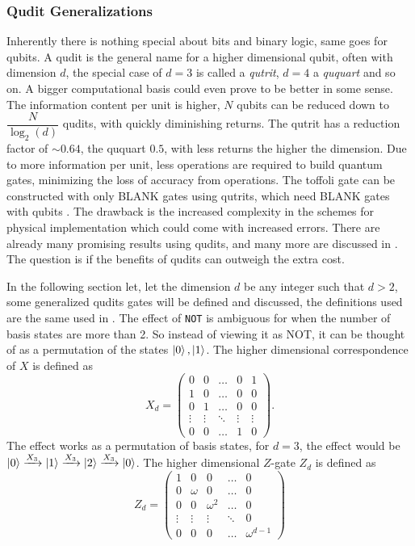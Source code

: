 \subsubsection{Qudit Generalizations}
Inherently there is nothing special about bits and binary logic, same goes for qubits.  A qudit is the general name for a higher dimensional qubit, often with dimension $d$, the special case of $d = 3 
$ is called a \textit{qutrit}, $d = 4$ a \textit{ququart} and so on. A bigger computational basis could even prove to be better in some sense. The information content per unit is higher, $N$ qubits can be reduced down to $\dfrac{N}{\log_2(d)}$ qudits\cite{info_qudit}, with quickly diminishing returns. The qutrit has a reduction factor of $\sim 0.64$, the ququart $0.5$, with less returns the higher the dimension. Due to more information per unit, less operations are required to build quantum gates, minimizing the loss of accuracy from operations. The toffoli gate can be constructed with only BLANK gates using qutrits, which need BLANK gates with qubits . The drawback is the increased complexity in the schemes for physical implementation which could come with increased errors. There are already many promising results using qudits\cite{qutrit1}\cite{qudit2}\cite{qudit3}, and many more are discussed in \cite{qudit}. The question is if the benefits of qudits can outweigh the extra cost.

In the following section let, let the dimension $d$ be any integer such that $d > 2$, some generalized qudits gates will be defined and discussed, the definitions used are the same used in \cite{qudit}.
The effect of {\tt NOT} is ambiguous for when the number of basis states are more than 2. So instead of viewing it as NOT, it can be thought of as a permutation of the states $\ket{0},\ket{1}$. The higher dimensional correspondence of $X$ is defined as
\begin{equation}
X_d = \begin{pmatrix}
0 & 0 & \dots & 0 & 1\\
1 & 0 & \dots & 0 & 0\\
0 & 1 & \dots & 0 & 0\\
\vdots & \vdots &\ddots& \vdots&\vdots\\
0 & 0& \dots & 1 & 0
\end{pmatrix}.
\end{equation}
The effect works as a permutation of basis states, for $d = 3$, the effect would be $\ket{0} \xrightarrow{X_3} \ket{1} \xrightarrow{X_3} \ket{2} \xrightarrow{X_3} \ket{0}$.
The higher dimensional $Z$-gate $Z_d$ is defined as 
\begin{equation}
Z_d = \begin{pmatrix}
1 & 0 & 0 & \dots & 0 \\
0 & \omega & 0 &\dots & 0\\
0 & 0 & \omega^2&\dots & 0 \\
\vdots & \vdots&\vdots&\ddots& 0\\
0 & 0& 0&\dots  & \omega^{d-1}
\end{pmatrix}
\end{equation}

